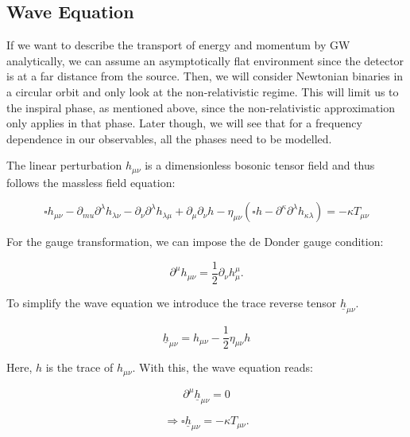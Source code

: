 \subsection{Wave Equation}

If we want to describe the transport of energy and momentum by GW analytically, we can assume an asymptotically flat environment since the detector is at a far distance from the source. Then, we will consider Newtonian binaries in a circular orbit and only look at the non-relativistic regime. This will limit us to the inspiral phase, as mentioned above, since the non-relativistic approximation only applies in that phase. Later though, we will see that for a frequency dependence in our observables, all the phases need to be modelled.

The linear perturbation $h_{\mu\nu}$ is a dimensionless bosonic tensor field and thus follows the massless field equation:

\begin{equation}
    \square h_{\mu\nu} -\partial_{mu} \partial^\lambda h_{\lambda\nu}-\partial_\nu\partial^\lambda h_{\lambda\mu}+\partial_\mu \partial_\nu h - \eta_{\mu\nu}(\square h-\partial^\kappa \partial^\lambda h_{\kappa\lambda})=-\kappa T_{\mu\nu}
\end{equation}

For the gauge transformation, we can impose the de Donder gauge condition:

\begin{equation}
    \partial^\mu h_{\mu\nu} = \frac{1}{2}\partial_\nu h_\mu^\mu .
    \label{de_donder}
\end{equation}

To simplify the wave equation we introduce the trace reverse tensor $\underline{h}_{\mu\nu}$.

\begin{equation}
    \underline{h}_{\mu\nu} = h_{\mu\nu}-\frac{1}{2} \eta_{\mu\nu}h
    \label{trace_reverse}
\end{equation}

Here, $h$ is the trace of $h_{\mu\nu}$. With this, the wave equation reads:

\begin{equation}
    \partial^\mu \underline{h}_{\mu\nu}=0
\end{equation}

\begin{equation}
    \Rightarrow \square \underline{h}_{\mu\nu}=-\kappa T_{\mu\nu}.
\end{equation}


